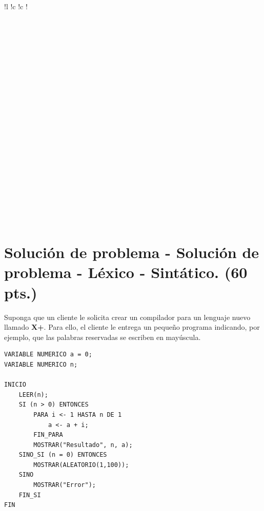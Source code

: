 \documentclass{exam}
\begin{document}
\begin{table}[H]
\begin{tabular}{
    !{\color{gray!50}\vrule}l
    !{\color{gray!50}\vrule}c
    !{\color{gray!50}\vrule}c
    !{\color{gray!50}\vrule}} 
     \hline
     \\
     \\ \\ \\ \\ \\ \\
    ~~~~~~~~~~~~~~~~~~~~~~~~~~~~~~~~~~~~~~~~~~~~~~~~~~~~~~~~~~~~~~~~~~~~~~~~~~~~~~~~~~~~~~~~~~~~~~~~~~~~~~~~~~~~~~~~~~~~~~~~~~~~~~~
    \\ \\ \\ \\ \\ \\ \\ \\ \\ \\ \\ \\ \\ \\  \hline
\end{tabular}
\end{table}

\clearpage

\section{\textbf{Soluci\'on de problema - Soluci\'on de problema - L\'exico - Sint\'atico. (60 pts.)}}

\noindent
Suponga que un cliente le solicita crear un compilador para un lenguaje nuevo llamado \textbf{X+}. Para ello, el cliente le entrega un peque\~no programa indicando, por ejemplo, que las palabras reservadas se escriben en may\'uscula.

\begin{verbatim}
VARIABLE NUMERICO a = 0;
VARIABLE NUMERICO n;

INICIO
    LEER(n);
    SI (n > 0) ENTONCES
        PARA i <- 1 HASTA n DE 1
            a <- a + i;
        FIN_PARA
        MOSTRAR("Resultado", n, a);
    SINO_SI (n = 0) ENTONCES
        MOSTRAR(ALEATORIO(1,100));
    SINO
        MOSTRAR("Error");
    FIN_SI
FIN
\end{verbatim}
\end{document}
